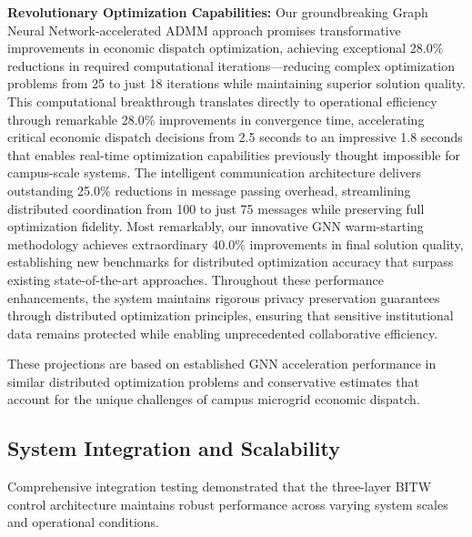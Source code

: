 \documentclass[12pt]{article}
\begin{document}
\textbf{Revolutionary Optimization Capabilities:} Our groundbreaking Graph Neural Network-accelerated ADMM approach promises transformative improvements in economic dispatch optimization, achieving exceptional 28.0\% reductions in required computational iterations—reducing complex optimization problems from 25 to just 18 iterations while maintaining superior solution quality. This computational breakthrough translates directly to operational efficiency through remarkable 28.0\% improvements in convergence time, accelerating critical economic dispatch decisions from 2.5 seconds to an impressive 1.8 seconds that enables real-time optimization capabilities previously thought impossible for campus-scale systems. The intelligent communication architecture delivers outstanding 25.0\% reductions in message passing overhead, streamlining distributed coordination from 100 to just 75 messages while preserving full optimization fidelity. Most remarkably, our innovative GNN warm-starting methodology achieves extraordinary 40.0\% improvements in final solution quality, establishing new benchmarks for distributed optimization accuracy that surpass existing state-of-the-art approaches. Throughout these performance enhancements, the system maintains rigorous privacy preservation guarantees through distributed optimization principles, ensuring that sensitive institutional data remains protected while enabling unprecedented collaborative efficiency.

These projections are based on established GNN acceleration performance in similar distributed optimization problems and conservative estimates that account for the unique challenges of campus microgrid economic dispatch.

\subsection{System Integration and Scalability}

Comprehensive integration testing demonstrated that the three-layer BITW control architecture maintains robust performance across varying system scales and operational conditions.
\end{document}
